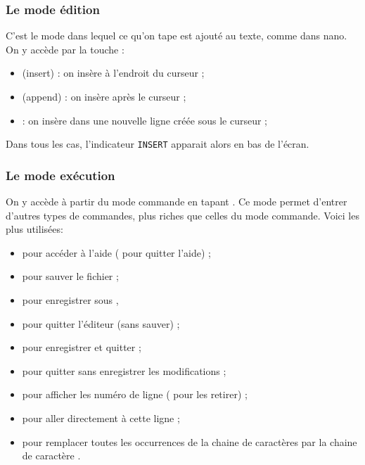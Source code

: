 \documentclass[a4paper,11pt]{style-esi/td}
\begin{document}
                \subsubsection*{Le mode édition}
            
                    C'est le mode dans lequel ce qu'on tape est ajouté au texte,
                    comme dans nano.
                    On y accède par la touche :
                    \begin{itemize}
                    \item {} (insert) : on insère à l'endroit du curseur ;
                    \item {} (append) : on insère après le curseur ;
                    \item {} : on insère dans une nouvelle ligne créée sous le curseur ;
                    \end{itemize}
    
                    Dans tous les cas, l'indicateur \texttt{INSERT} 
                    apparait alors en bas de l'écran.
    
                \subsubsection*{Le mode exécution}
                
                    On y accède à partir du mode commande en tapant \kbd{:}.
                    Ce mode permet d'entrer d'autres types de commandes,
                    plus riches que celles du mode commande. 
                    Voici les plus utilisées:
                    \begin{itemize}
                    \item {} pour accéder à l'aide ( pour quitter l'aide) ;
                    \item {} pour sauver le fichier ;
                    \item {} pour enregistrer sous ,
                    \item {} pour quitter l'éditeur (sans sauver) ;
                    \item {} pour enregistrer et quitter ;
                    \item {} pour quitter sans enregistrer les modifications ;
                    \item {} pour afficher les numéro de ligne 
                        ( pour les retirer) ;
                    \item {} pour aller directement à cette ligne ;
                    \item {} 
                        pour remplacer toutes les occurrences de la chaine de caractères 
                         par la chaine de caractère .
                    \end{itemize}
    
\end{document}
